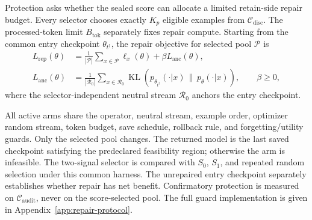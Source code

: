 Protection asks whether the sealed score can allocate a limited retain-side
repair budget. Every selector chooses exactly $K_p$ eligible examples from
$\mathcal C_{\mathrm{disc}}$. The processed-token limit
$B_{\mathrm{tok}}$ separately fixes repair compute. Starting from the common
entry checkpoint $\theta_{t^\dagger}$, the repair objective for selected pool
$\mathcal P$ is
\begin{equation}
  \begin{aligned}
    L_{\mathrm{rep}}(\theta)
    &=
    \frac{1}{|\mathcal P|}
    \sum_{x\in\mathcal P}\ell_x(\theta)
    +\beta L_{\mathrm{anc}}(\theta),\\
    L_{\mathrm{anc}}(\theta)
    &=
    \frac{1}{|\mathcal R_0|}
    \sum_{x\in\mathcal R_0}
    \operatorname{KL}\!\left(
      p_{\theta_{t^\dagger}}(\cdot|x)\,\|\,p_\theta(\cdot|x)
    \right),
    \qquad \beta\geq0 ,
  \end{aligned}
  \label{eq:budgeted-repair}
\end{equation}
where the selector-independent neutral stream $\mathcal R_0$ anchors the
entry checkpoint.

All active arms share the operator, neutral stream, example order, optimizer
random stream, token budget, save schedule, rollback rule, and
forgetting/utility guards. Only the selected pool changes. The returned model
is the last saved checkpoint satisfying the predeclared feasibility region;
otherwise the arm is infeasible. The two-signal selector is compared with
$S_0$, $S_1$, and repeated random selection under this common harness. The
unrepaired entry checkpoint separately establishes whether repair has net
benefit. Confirmatory protection is measured on
$\mathcal C_{\mathrm{audit}}$, never on the score-selected pool. The full guard
implementation is given in Appendix~\ref{app:repair-protocol}.

